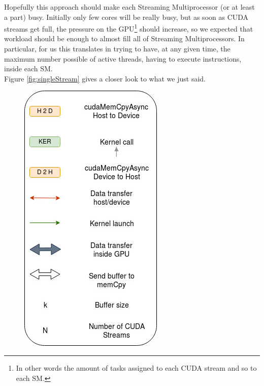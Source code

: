 	
	Hopefully this approach should make each Streaming Multiprocessor (or at least a part) busy.
	Initially only few cores will be really busy, but as soon as CUDA streams get full, the pressure on the GPU\footnote{In other words the amount of tasks assigned to each CUDA stream and so to each SM.} should increase, so we expected that workload should be enough to almost fill all of Streaming Multiprocessors.
	In particular, for us this translates in trying to have, at any given time, the maximum number possible of active threads, having to execute instructions, inside each SM.\\
	Figure \ref{fig:singleStream} gives a closer look to what we just said.\\
	\begin{figure}
		\centering
		\includegraphics[width=1\linewidth]{images/logicLegenda.jpg}

\end{figure}
